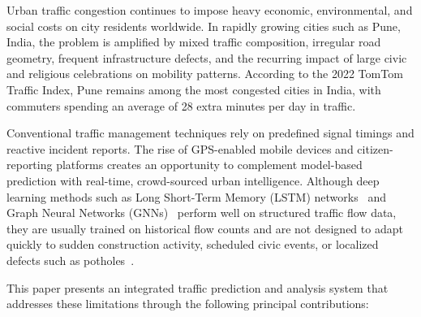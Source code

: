 \documentclass[conference]{IEEEtran}
\begin{document}
Urban traffic congestion continues to impose heavy economic, environmental, and social costs on city residents worldwide. In rapidly growing cities such as Pune, India, the problem is amplified by mixed traffic composition, irregular road geometry, frequent infrastructure defects, and the recurring impact of large civic and religious celebrations on mobility patterns. According to the 2022 TomTom Traffic Index, Pune remains among the most congested cities in India, with commuters spending an average of 28 extra minutes per day in traffic.

Conventional traffic management techniques rely on predefined signal timings and reactive incident reports. The rise of GPS-enabled mobile devices and citizen-reporting platforms creates an opportunity to complement model-based prediction with real-time, crowd-sourced urban intelligence. Although deep learning methods such as Long Short-Term Memory (LSTM) networks~\cite{b7} and Graph Neural Networks (GNNs)~\cite{b3} perform well on structured traffic flow data, they are usually trained on historical flow counts and are not designed to adapt quickly to sudden construction activity, scheduled civic events, or localized defects such as potholes~\cite{b4}.

This paper presents an integrated traffic prediction and analysis system that addresses these limitations through the following principal contributions:
\end{document}
